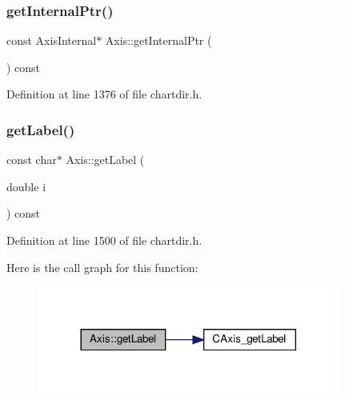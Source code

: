 \subsubsection{\texorpdfstring{get\+Internal\+Ptr()}{getInternalPtr()}\hspace{0.1cm}{\footnotesize\ttfamily [2/2]}}
{\footnotesize\ttfamily const Axis\+Internal$\ast$ Axis\+::get\+Internal\+Ptr (\begin{DoxyParamCaption}{ }\end{DoxyParamCaption}) const\hspace{0.3cm}{\ttfamily [inline]}}



Definition at line 1376 of file chartdir.\+h.

\mbox{\label{class_axis_aaf144ea75fa846472c72382e097b50a4}} 
\subsubsection{\texorpdfstring{get\+Label()}{getLabel()}}
{\footnotesize\ttfamily const char$\ast$ Axis\+::get\+Label (\begin{DoxyParamCaption}\item[{double}]{i }\end{DoxyParamCaption}) const\hspace{0.3cm}{\ttfamily [inline]}}



Definition at line 1500 of file chartdir.\+h.

Here is the call graph for this function\+:
\nopagebreak
\begin{figure}[H]
\begin{center}
\leavevmode
\includegraphics[width=281pt]{class_axis_aaf144ea75fa846472c72382e097b50a4_cgraph}
\end{center}
\end{figure}
\mbox{\label{class_axis_a5c187793e791bd6e5ce8ee1f63a114e8}} 
